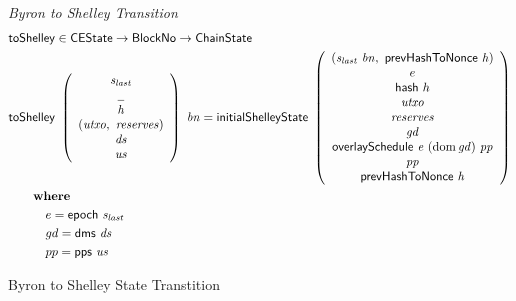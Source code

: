 \begin{figure}[htb]
  \emph{Byron to Shelley Transition}
  \begin{align*}
      & \fun{toShelley} \in \CEState \to \BlockNo \to \ChainState \\
      & \fun{toShelley}~
      \left(
        \begin{array}{c}
          \var{s_{last}} \\
          \wcard \\
          \var{h} \\
          (\var{utxo},~\var{reserves}) \\
          \var{ds} \\
          \var{us}
        \end{array}
      \right)~\var{bn}
      =
      \fun{initialShelleyState}~
      \left(
        \begin{array}{c}
          (\var{s_{last}}~\var{bn},~\prevHashToNonce{h}) \\
          e \\
          \fun{hash}~{h} \\
          \var{utxo} \\
          \var{reserves} \\
          \var{gd} \\
          \overlaySchedule{e}{(\dom{gd})}{pp} \\
          \var{pp} \\
          \prevHashToNonce{h} \\
        \end{array}
      \right) \\
      & ~~~~\where \\
      & ~~~~~~~~~e = \epoch{s_{last}} \\
      & ~~~~~~~~~gd = \fun{dms}~\var{ds} \\
      & ~~~~~~~~~pp = \pps{us} \\
  \end{align*}

  \caption{Byron to Shelley State Transtition}
  \label{fig:functions:to-shelley}
\end{figure}

